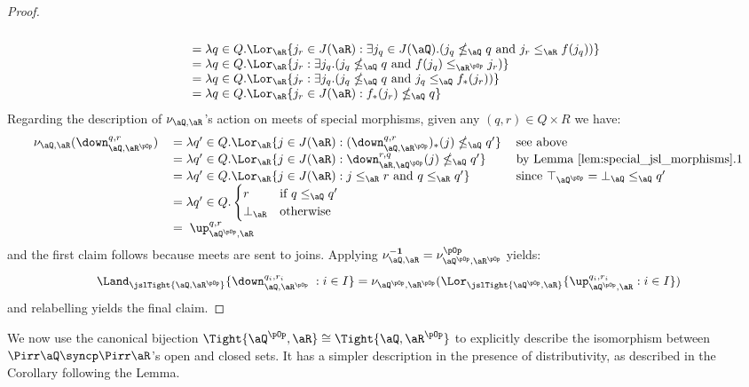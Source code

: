 \documentclass{article}
\begin{document}
\begin{proof}
\[\begin{tabular}{lll}
\\&
$= \lambda q \in Q. \Lor_\aR \{ j_r \in J(\aR) : \exists j_q \in J(\aQ).(j_q \nleq_\aQ q \text{ and } j_r \leq_\aR f(j_q) )  \}$
\\&
$= \lambda q \in Q. \Lor_\aR \{ j_r : \exists j_q.(j_q \nleq_\aQ q \text{ and } f(j_q) \leq_{\aR^{\pOp}} j_r )  \}$
\\&
$= \lambda q \in Q. \Lor_\aR \{ j_r : \exists j_q.(j_q \nleq_\aQ q \text{ and } j_q \leq_\aQ f_*(j_r) )  \}$
\\&
$= \lambda q \in Q. \Lor_\aR \{ j_r  \in J(\aR) : f_*(j_r) \nleq_\aQ q \}$
\end{tabular}
\]
Regarding the description of $\nu_{\aQ,\aR}$'s action on meets of special morphisms, given any $(q,r) \in Q \times R$ we have:
\[
\begin{tabular}{lll}
$\nu_{\aQ,\aR}(\down_{\aQ,\aR^{\pOp}}^{q,r})$
&
$= \lambda q' \in Q. \Lor_\aR \{ j \in J(\aR) : (\down_{\aQ,\aR^{\pOp}}^{q,r})_*(j) \nleq_\aQ q' \}$
& see above
\\&
$= \lambda q' \in Q. \Lor_\aR \{ j \in J(\aR) : \down_{\aR,\aQ^{\pOp}}^{r,q}(j) \nleq_\aQ q' \}$
& by Lemma \ref{lem:special_jsl_morphisms}.1
\\&
$= \lambda q' \in Q. \Lor_\aR \{ j \in J(\aR) : j \leq_\aR r \text{ and } q \leq_\aR q'  \}$
& since $\top_{\aQ^{\pOp}} = \bot_\aQ \leq_\aQ q'$
\\&
$= \lambda q' \in Q. \begin{cases} r & \text{if $q \leq_\aQ q'$} \\ \bot_\aR & \text{otherwise} \end{cases}$
\\&
$= \; \up_{\aQ^{\pOp},\aR}^{q,r}$
\end{tabular}
\]
and the first claim follows because meets are sent to joins. Applying $\nu_{\aQ,\aR}^{\bf-1} = \nu_{\aQ^{\pOp},\aR^{\pOp}}^{\pOp}$ yields:
\[
\Land_{\jslTight{\aQ,\aR^{\pOp}}} \{ \down_{\aQ,\aR^{\pOp}}^{q_i,r_i} \; : i \in I \}
= \nu_{\aQ^{\pOp},\aR^{\pOp}}(\Lor_{\jslTight{\aQ^{\pOp},\aR}} \{ \up_{\aQ^{\pOp},\aR}^{q_i,r_i} : i \in I \})
\]
and relabelling yields the final claim.
\end{proof}




We now use the canonical bijection $\Tight{\aQ^{\pOp},\aR} \cong \Tight{\aQ,\aR^{\pOp}}$ to explicitly describe the isomorphism between $\Pirr\aQ \syncp \Pirr\aR$'s open and closed sets. It has a simpler description in the presence of distributivity, as described in the Corollary following the Lemma.
\end{document}
